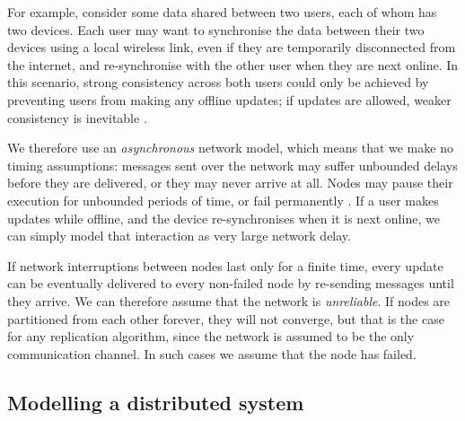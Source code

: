 For example, consider some data shared between two users, each of whom has two devices. 
Each user may want to synchronise the data between their two devices using a local wireless link, even if they are temporarily disconnected from the internet, and re-synchronise with the other user when they are next online. 
In this scenario, strong consistency across both users could only be achieved by preventing users from making any offline updates; if updates are allowed, weaker consistency is inevitable \cite{Attiya:2015dm,Davidson:1985hv}.

We therefore use an \emph{asynchronous} network model, which means that we make no timing assumptions: messages sent over the network may suffer unbounded delays before they are delivered, or they may never arrive at all. 
Nodes may pause their execution for unbounded periods of time, or fail permanently \cite{Cachin:2011wt}. 
If a user makes updates while offline, and the device re-synchronises when it is next online, we can simply model that interaction as very large network delay.


If network interruptions between nodes last only for a finite time, every update can be eventually delivered to every non-failed node by re-sending messages until they arrive.
We can therefore assume that the network is \emph{unreliable}.
If nodes are partitioned from each other forever, they will not converge, but that is the case for any replication algorithm, since the network is assumed to be the only communication channel.
In such cases we assume that the node has failed.

\subsection{Modelling a distributed system}

